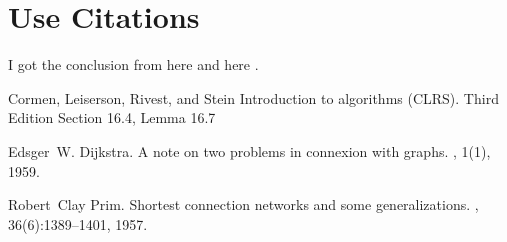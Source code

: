 \documentclass{article}[12pt]
\begin{document}
\section{Use Citations}

I got the conclusion from here \cite{matroids} and here \cite{dijkstra1959,prim1957shortest}.



\begin{thebibliography}{10}

Cormen, Leiserson, Rivest, and Stein
\newblock Introduction to algorithms (CLRS). Third Edition
\newblock Section 16.4, Lemma 16.7

Edsger~W. Dijkstra.
\newblock A note on two problems in connexion with graphs.
, 1(1), 1959.

Robert~Clay Prim.
\newblock Shortest connection networks and some generalizations.
, 36(6):1389--1401, 1957.

\end{thebibliography}
\end{document}
